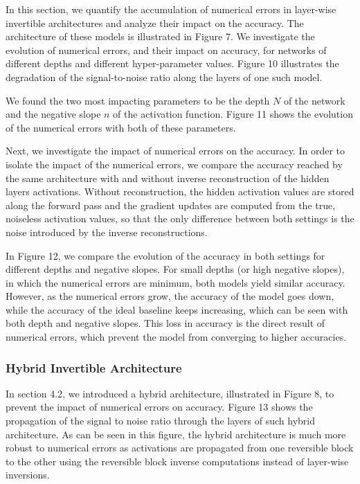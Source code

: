 \documentclass[twocolumn]{bmcart}
\begin{document}
In this section, we quantify the accumulation of numerical errors in layer-wise invertible architectures and analyze their impact on the accuracy.
The architecture of these models is illustrated in Figure 7.
We investigate the evolution of numerical errors, and their impact on accuracy, for networks of different depths and different hyper-parameter values.
Figure 10 illustrates the degradation of the signal-to-noise ratio along the layers of one such model.

We found the two most impacting parameters to be the depth $N$ of the network and the negative slope $n$ of the activation function.
Figure 11 shows the evolution of the numerical errors with both of these parameters.

Next, we investigate the impact of numerical errors on the accuracy.
In order to isolate the impact of the numerical errors,
we compare the accuracy reached by the same architecture with and without inverse reconstruction of the hidden layers activations.
Without reconstruction, the hidden activation values are stored along the forward pass and the gradient updates are computed from the true,
noiseless activation values, so that the only difference between both settings is the noise introduced by the inverse reconstructions.

In Figure 12, we compare the evolution of the accuracy in both settings for different depths and negative slopes.
For small depths (or high negative slopes), in which the numerical errors are minimum, both models yield similar accuracy.
However, as the numerical errors grow, the accuracy of the model goes down,
while the accuracy of the ideal baseline keeps increasing,
which can be seen with both depth and negative slopes.
This loss in accuracy is the direct result of numerical errors,
which prevent the model from converging to higher accuracies.

\subsubsection{Hybrid Invertible Architecture}

In section 4.2, we introduced a hybrid architecture,
illustrated in Figure 8, to prevent the impact of numerical errors on accuracy.
Figure 13 shows the propagation of the signal to noise ratio through the layers of such hybrid architecture.
As can be seen in this figure, the hybrid architecture is much more robust to numerical errors as activations
are propagated from one reversible block to the other using the reversible block inverse computations instead of layer-wise inversions.
\end{document}
